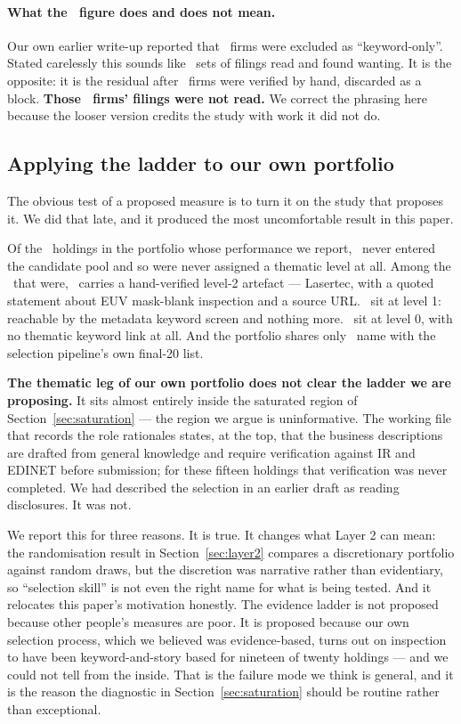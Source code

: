 \documentclass[a4paper,11pt]{article}
\begin{document}
\paragraph{What the \LadderKeywordOnly\ figure does and does not mean.} Our own earlier write-up reported that \LadderKeywordOnly\ 
firms were excluded as ``keyword-only''. Stated carelessly this sounds like \LadderKeywordOnly\ sets of filings read
and found wanting. It is the opposite: it is the residual after \LadderVerified\ firms were verified
by hand, discarded as a block. \textbf{Those \LadderKeywordOnly\ firms' filings were not read.} We correct the
phrasing here because the looser version credits the study with work it did not do.

\subsection{Applying the ladder to our own portfolio}\label{sec:own-audit}

The obvious test of a proposed measure is to turn it on the study that proposes it. We did that late,
and it produced the most uncomfortable result in this paper.

Of the \OwnHoldings\ holdings in the portfolio whose performance we report,
\OwnAbsent\ never entered the candidate pool and so were never assigned a thematic level at all.
Among the \OwnPresent\ that were, \OwnLevelTwo\ carries a hand-verified level-2 artefact ---
Lasertec, with a quoted statement about EUV mask-blank inspection and a source URL.
\OwnLevelOne\ sit at level 1: reachable by the metadata keyword screen and nothing more.
\OwnLevelZero\ sit at level 0, with no thematic keyword link at all. And the portfolio shares only
\OwnOverlap\ name with the selection pipeline's own final-20 list.

\textbf{The thematic leg of our own portfolio does not clear the ladder we are proposing.} It sits
almost entirely inside the saturated region of Section~\ref{sec:saturation} --- the region we argue is
uninformative. The working file that records the role rationales states, at the top, that the business
descriptions are drafted from general knowledge and require verification against IR and EDINET before
submission; for these fifteen holdings that verification was never completed. We had described the
selection in an earlier draft as reading disclosures. It was not.

We report this for three reasons. It is true. It changes what Layer 2 can mean: the randomisation
result in Section~\ref{sec:layer2} compares a discretionary portfolio against random draws, but the
discretion was narrative rather than evidentiary, so ``selection skill'' is not even the right name
for what is being tested. And it relocates this paper's motivation honestly. The evidence ladder is
not proposed because other people's measures are poor. It is proposed because our own selection
process, which we believed was evidence-based, turns out on inspection to have been keyword-and-story
based for nineteen of twenty holdings --- and we could not tell from the inside. That is the failure
mode we think is general, and it is the reason the diagnostic in Section~\ref{sec:saturation} should
be routine rather than exceptional.
\end{document}
